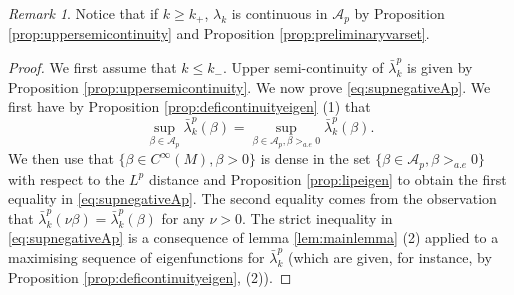 \documentclass[10pt]{amsart}
\numberwithin{equation}{section}
\theoremstyle{plain}
\theoremstyle{remark}
\newtheorem{rem}{Remark}[section]
\begin{document}
\begin{rem} \label{rem:continuite:vp:pos}
Notice that if $k\geq k_+$, $\lambda_k$ is continuous in $\mathcal{A}_p$ by Proposition \ref{prop:uppersemicontinuity} and Proposition \ref{prop:preliminaryvarset}.
\end{rem}

\begin{proof}
We first assume that $k \leq k_-$. Upper semi-continuity of $\bar{\lambda}_k^p$ is given by Proposition \ref{prop:uppersemicontinuity}. We now prove \eqref{eq:supnegativeAp}. We first have by Proposition \ref{prop:deficontinuityeigen} (1) that 
$$ \sup_{\beta \in \mathcal{A}_p} \bar{\lambda}_k^p(\beta) = \sup_{\beta \in \mathcal{A}_p, \beta >_{a.e} 0} \bar{\lambda}_k^p(\beta) .$$
We then use that  $\{ \beta \in C^\infty(M), \beta > 0 \} $ is dense in the set $\{ \beta \in \mathcal{A}_p, \beta >_{a.e} 0 \}$ with respect to the $L^p$ distance and Proposition \ref{prop:lipeigen} to obtain the first equality in \eqref{eq:supnegativeAp}. The second equality comes from the observation that $\bar{\lambda}_k^p(\nu \beta) = \bar{\lambda}_k^p(\beta)$ for any $\nu >0$. The strict inequality in \eqref{eq:supnegativeAp} is a consequence of lemma \ref{lem:mainlemma} (2) applied to a maximising sequence of eigenfunctions for $\bar{\lambda}_k^p$ (which are given, for instance, by Proposition \ref{prop:deficontinuityeigen}, (2)).


\end{proof}
\end{document}
